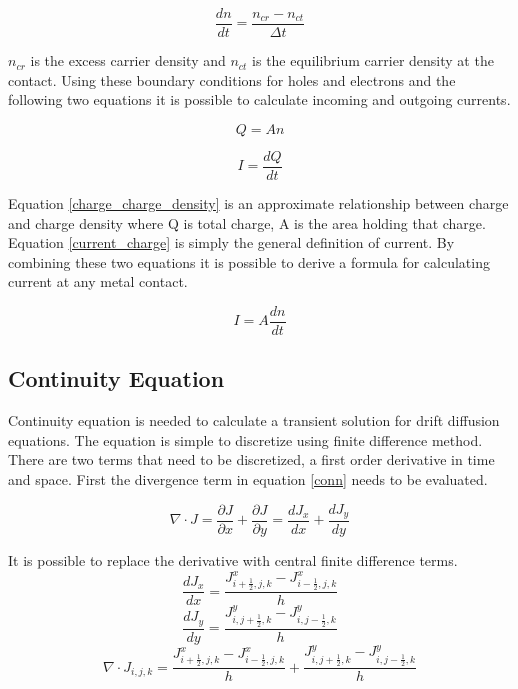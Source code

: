 \begin{doublespace}
\begin{equation}
\frac{dn}{dt}=\frac{n_{cr}-n_{ct}}{\Delta t}
\end{equation}

$n_{cr}$ is the excess carrier density and $n_{ct}$ is the equilibrium carrier density at the contact. Using these boundary conditions for holes and electrons and the following two equations it is possible to calculate incoming and outgoing currents. 

\begin{equation}
Q=An
\label{charge_charge_density}
\end{equation} 

\begin{equation}
I=\frac{dQ}{dt}
\label{current_charge}
\end{equation} 
 

Equation \ref{charge_charge_density} is an approximate relationship between charge and charge density where Q is total charge, A is the area holding that charge. Equation \ref{current_charge} is simply the general definition of current. By combining these two equations it is possible to derive a formula for calculating current at any metal contact.

\begin{equation}
I=A \frac{dn}{dt}
\label{current_charge_density}
\end{equation}


\clearpage
\subsection{Continuity Equation}
Continuity equation is needed to calculate a transient solution for drift diffusion equations. The equation is simple to discretize using finite difference method. There are two terms that need to be discretized, a first order derivative in time and space. First the divergence term in equation \eqref{conn} needs to be evaluated.

\begin{equation}
\nabla \cdot J=\frac{\partial J}{\partial x}+\frac{\partial J}{\partial y}=\frac{d J_x}{d x}+\frac{d J_y}{d y}
\end{equation}

It is possible to replace the derivative with central finite difference terms.
\begin{equation}
\frac{d J_x}{d x}=\frac{J^x_{i+\frac{1}{2},j,k}-J^x_{i-\frac{1}{2},j,k}}{h}
\end{equation}
\begin{equation}
\frac{d J_y}{d y}=\frac{J^y_{i,j+\frac{1}{2},k}-J^y_{i,j-\frac{1}{2},k}}{h}
\end{equation}
\begin{equation}
\nabla \cdot J_{i,j,k}=\frac{J^x_{i+\frac{1}{2},j,k}-J^x_{i-\frac{1}{2},j,k}}{h}+\frac{J^y_{i,j+\frac{1}{2},k}-J^y_{i,j-\frac{1}{2},k}}{h}
\label{delJ}
\end{equation}


\end{doublespace}
